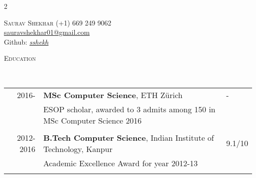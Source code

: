 \documentclass[9pt]{article}
\renewcommand{\arraystretch}{1.5}
\newenvironment{changemargin}[2]{%
  \begin{list}{}{%
      \setlength{\topsep}{0pt}%
    \setlength{\leftmargin}{#1}%
    \setlength{\rightmargin}{#2}%
    \setlength{\listparindent}{\parindent}%
  \setlength{\itemindent}{\parindent}%
    \setlength{\parsep}{\parskip}%
    }%
  \item[]}{\end{list}
    }
\newcommand{\lineover}{
  \begin{changemargin}{-0.05in}{-0.10in}
    \vspace*{-9pt}
    \hrulefill \\
    \vspace*{-2pt}
  \end{changemargin}
}
\newcommand{\header}[1]{
  \begin{changemargin}{-0.5in}{-0.5in}
    \scshape{#1}\\
        \lineover
  \end{changemargin}
}
\newcommand{\name}[1]{
  {\LARGE \scshape {#1}}
}
\newcommand{\contact}[4]{
  \begin{changemargin}{-0.65in}{-0.65in}
    \begin{multicols}{2}
      \name{{#1}}\vfill\null %
                        \columnbreak
                        {#2}\\	
                        {#3}\\ 
                        {#4}\\ 
    \end{multicols}
  \end{changemargin}
}
\begin{document}
\contact{Saurav Shekhar}
{{\hspace{172pt}}(+1) 669 249 9062}
{{\hspace{130pt}} \href{mailto:sauravshekhar01@gmail.com}{sauravshekhar01@gmail.com}}
{\hspace{190pt}Github: \href{http://github.com/sshekh}{\emph{{\textit{sshekh}}}}}

\header{Education}

\vspace{4pt}
        \renewcommand{\arraystretch}{1}
        \begin{tabular}{rll}
          2016- & \textbf{MSc Computer Science},  ETH Z{\"u}rich  &- \\
                  & ESOP scholar, awarded to 3 admits among 150 in MSc Computer Science 2016 &\\\\
          2012-2016 & \textbf{B.Tech Computer Science},  Indian Institute of Technology, Kanpur & 9.1/10 \\ 
                  &  Academic Excellence Award for year 2012-13 & \\\\
        \end{tabular}
\end{document}

